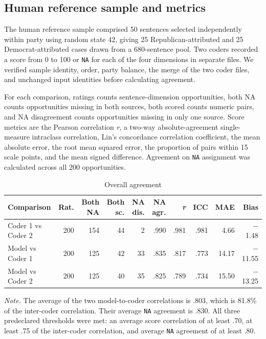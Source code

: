 \subsection*{Human reference sample and metrics}

The human reference sample comprised 50 sentences selected independently within party using random state 42, giving 25 Republican-attributed and 25 Democrat-attributed cases drawn from a 680-sentence pool. Two coders recorded a score from 0 to 100 or \texttt{NA} for each of the four dimensions in separate files. We verified sample identity, order, party balance, the merge of the two coder files, and unchanged input identities before calculating agreement.

For each comparison, ratings counts sentence-dimension opportunities, both NA counts opportunities missing in both sources, both scored counts numeric pairs, and NA disagreement counts opportunities missing in only one source. Score metrics are the Pearson correlation \textit{r}, a two-way absolute-agreement single-measure intraclass correlation, Lin's concordance correlation coefficient, the mean absolute error, the root mean squared error, the proportion of pairs within 15 scale points, and the mean signed difference. Agreement on \texttt{NA} assignment was calculated across all 200 opportunities.

\begin{table}[htbp]
\centering\small
\caption{Overall agreement}
\begin{tabular}{@{}p{}rrrrrrrrr@{}}
\toprule
\textbf{Comparison} & \textbf{Rat.} & \textbf{Both NA} & \textbf{Both sc.} & \textbf{NA dis.} & \textbf{NA agr.} & \textbf{\textit{r}} & \textbf{ICC} & \textbf{MAE} & \textbf{Bias} \\
\midrule
Coder 1 vs Coder 2 & 200 & 154 & 44 & 2 & .990 & .981 & .981 & 4.66 & $-$1.48 \\
Model vs Coder 1 & 200 & 125 & 42 & 33 & .835 & .817 & .773 & 14.17 & $-$11.55 \\
Model vs Coder 2 & 200 & 125 & 40 & 35 & .825 & .789 & .734 & 15.50 & $-$13.25 \\
\bottomrule
\end{tabular}
\begin{minipage}{\textwidth}\footnotesize \textit{Note.} The average of the two model-to-coder correlations is .803, which is 81.8\% of the inter-coder correlation. Their average \texttt{NA} agreement is .830. All three predeclared thresholds were met: an average score correlation of at least .70, at least .75 of the inter-coder correlation, and average \texttt{NA} agreement of at least .80.\end{minipage}
\end{table}

